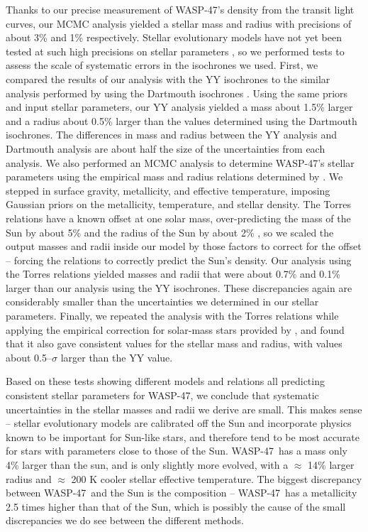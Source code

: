 \documentclass{emulateapj}
\newcommand{\ron}{\color{black}}
\newcommand{\thisstar}{WASP-47}
\begin{document}
Thanks to our precise measurement of \thisstar's density from the transit light curves, our MCMC analysis yielded a stellar mass and radius with precisions of about 3\% and 1\% respectively. Stellar evolutionary models have not yet been tested at such high precisions on stellar parameters \citep{torresmasses}, so we performed tests to assess the scale of systematic errors in the isochrones we used.  First, we compared the results of our analysis with the YY isochrones to the similar analysis performed by \citet{almenara} using the Dartmouth isochrones \citep{Dotter:2008}. Using the same priors and input stellar parameters, our YY analysis yielded a mass about 1.5\% larger and a radius about 0.5\% larger than the values  \citet{almenara} determined using the Dartmouth isochrones. The differences in mass and radius between the YY analysis and Dartmouth analysis are about half the size of the uncertainties from each analysis. We also performed an MCMC analysis to determine \thisstar's stellar parameters using the empirical mass and radius relations determined by \citet{torresmasses}. We stepped in surface gravity, metallicity, and effective temperature, imposing Gaussian priors on the metallicity, temperature, and stellar density. The Torres relations have a known offset {\ron at} one solar mass, over-predicting the mass of the Sun by about 5\% and the radius of the Sun by about 2\% \citep{torresmasses}, so we scaled the output masses and radii inside our model by those factors to correct for the offset -- forcing the relations to correctly predict the Sun's density. Our analysis using the Torres relations yielded masses and radii that were about 0.7\% and 0.1\% larger than our analysis using the YY isochrones. These discrepancies again are considerably smaller than the uncertainties we determined in our stellar parameters. Finally, we repeated the analysis with the Torres relations while applying the empirical correction for solar-mass stars provided by \citet{santos}, and found that it also gave consistent values for the stellar mass and radius, with values about 0.5--$\sigma$ larger than the YY value. 

Based on these tests showing different models and relations all predicting consistent stellar parameters for \thisstar, we conclude that systematic uncertainties in the stellar masses and radii we derive are small. This makes sense -- stellar evolutionary models are calibrated off the Sun and incorporate physics known to be important for Sun-like stars, and therefore tend to be most accurate for stars with parameters close to those of the Sun. \thisstar\ has a mass only 4\% larger than the sun, and is only slightly more evolved, with a $\approx$ 14\% larger radius and $\approx$ 200 K cooler stellar effective temperature. The biggest discrepancy between \thisstar\ and the Sun is the composition -- \thisstar\ has a metallicity 2.5 times higher than that of the Sun, which is possibly the cause of the small discrepancies we do see between the different methods.  
\end{document}
